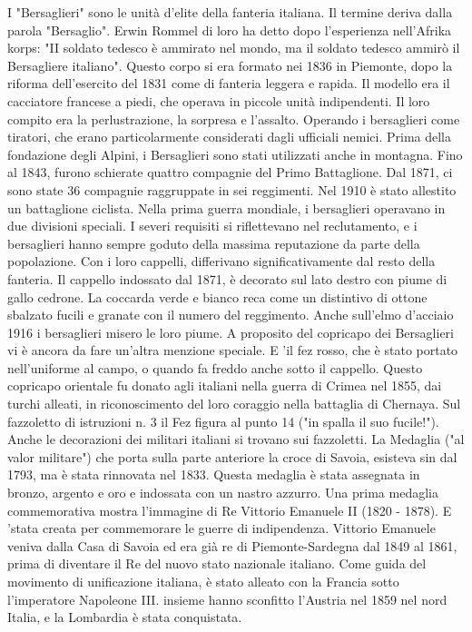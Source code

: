 I "Bersaglieri" sono le unità d'elite della fanteria italiana. Il termine deriva dalla parola "Bersaglio". Erwin Rommel di loro ha detto dopo l'esperienza nell'Afrika korps: "II soldato tedesco è ammirato nel mondo, ma il soldato tedesco ammirò il Bersagliere italiano". Questo corpo si era formato nei 1836 in Piemonte, dopo la riforma dell'esercito del 1831 come di fanteria leggera e rapida. Il modello era il cacciatore francese a piedi, che operava in piccole unità indipendenti. Il loro compito era la perlustrazione, la sorpresa e l'assalto. Operando i bersaglieri come tiratori, che erano particolarmente considerati dagli ufficiali nemici. Prima della fondazione degli Alpini, i Bersaglieri sono stati utilizzati anche in montagna. Fino al 1843, furono schierate quattro compagnie del Primo Battaglione. Dal 1871, ci sono state 36 compagnie raggruppate in sei reggimenti. Nel 1910 è stato allestito un battaglione ciclista. Nella prima guerra mondiale, i bersaglieri operavano in due divisioni speciali.
   I severi requisiti si riflettevano nel reclutamento, e i bersaglieri hanno sempre goduto della massima reputazione da parte della popolazione. Con i loro cappelli, differivano significativamente dal resto della fanteria. Il cappello indossato dal 1871, è decorato sul lato destro con piume di gallo cedrone. La coccarda verde e bianco reca come un distintivo di ottone sbalzato fucili e granate con il numero del reggimento. Anche sull'elmo d'acciaio 1916 i bersaglieri misero le loro piume. A proposito del copricapo dei Bersaglieri vi è ancora da fare un'altra menzione speciale. E 'il fez rosso, che è stato portato nell'uniforme al campo, o quando fa freddo anche sotto il cappello. Questo copricapo orientale fu donato agli italiani nella guerra di Crimea nel 1855, dai turchi alleati, in riconoscimento del loro coraggio nella battaglia di Chernaya. Sul fazzoletto di istruzioni n. 3 il Fez figura al punto 14 ("in spalla il suo fucile!").
   Anche le decorazioni dei militari italiani si trovano sui fazzoletti. La Medaglia ("al valor militare") che porta sulla parte anteriore la croce di Savoia, esisteva sin dal 1793, ma è stata rinnovata nel 1833. Questa medaglia è stata assegnata in bronzo, argento e oro e indossata con un nastro azzurro.
   Una prima medaglia commemorativa  mostra l'immagine di Re Vittorio Emanuele II (1820 - 1878). E 'stata creata per commemorare le guerre di indipendenza. Vittorio Emanuele veniva dalla Casa di Savoia ed era già re di Piemonte-Sardegna dal 1849 al 1861, prima di diventare il Re del nuovo stato nazionale italiano. Come guida del movimento di unificazione italiana, è stato alleato con la Francia sotto l'imperatore Napoleone III. insieme hanno sconfitto l'Austria nel 1859 nel nord Italia, e la Lombardia è stata conquistata.
   
